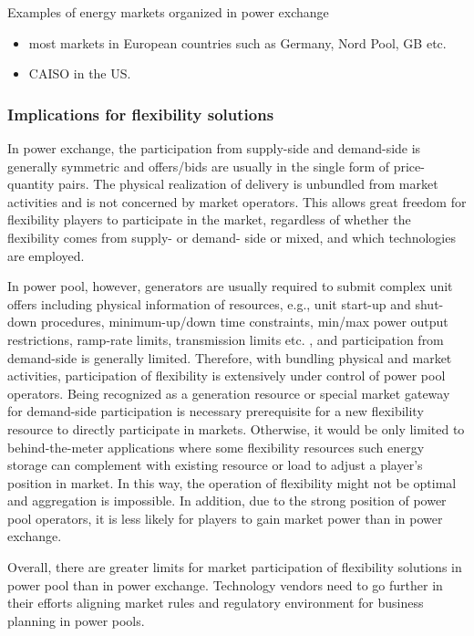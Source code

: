 Examples of energy markets organized in power exchange
	\begin{itemize}
		\item most markets in European countries such as Germany, Nord Pool, GB etc.
		\item CAISO in the US.
	\end{itemize}

\subsubsection{Implications for flexibility solutions}
In power exchange, the participation from supply-side and demand-side is generally symmetric and offers/bids are usually in the single form of price-quantity pairs. The physical realization of delivery is unbundled  from market activities and is not concerned by market operators. This allows great freedom for flexibility players to participate in the market, regardless of whether the flexibility comes from supply- or demand- side or mixed, and which technologies are employed. 

In power pool, however, generators are usually required to submit complex unit offers including physical information of resources, e.g., unit start-up and shut-down procedures, minimum-up/down time constraints, min/max power output restrictions, ramp-rate limits, transmission limits etc. \cite{Kardakos2013}, and participation from demand-side is generally limited. Therefore, with bundling physical and market activities, participation of flexibility is extensively under control of power pool operators. Being recognized as a generation resource or special market gateway for demand-side participation is necessary prerequisite for a new flexibility resource to directly participate in markets. Otherwise, it would be only limited to behind-the-meter applications where some flexibility resources such energy storage can complement with existing resource or load to adjust a player's position in market. In this way, the operation of flexibility might not be optimal and aggregation is impossible. In addition, due to the strong position of power pool operators, it is less likely for players to gain market power than in power exchange.

Overall, there are greater limits for market participation of flexibility solutions in power pool than in power exchange. Technology vendors need to go further in their efforts aligning market rules and regulatory environment for business planning in power pools. 

